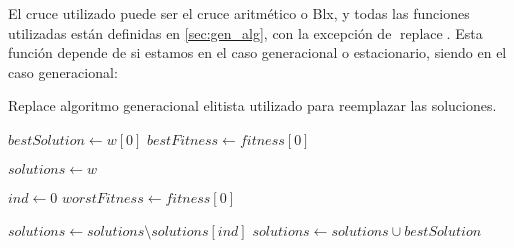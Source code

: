 \documentclass[11pt,a4paper]{article}
\begin{document}
El cruce utilizado puede ser el cruce aritmético o Blx, y todas las funciones utilizadas están definidas en \ref{sec:gen_alg}, con la excepción de $\operatorname{replace}$. Esta función depende de si estamos en el caso generacional o estacionario, siendo en el caso generacional: \\
\begin{algorithm}[H]
	\caption{{\sc Replace} algoritmo generacional elitista utilizado para reemplazar las soluciones.}
	
	$bestSolution \gets w[0]$ \;
	$bestFitness \gets fitness[0]$ \;
	
	$solutions \gets w$ \;
	
	$ind \gets 0$ \;
	$worstFitness \gets fitness[0]$ \;
	
	$solutions \gets solutions \setminus solutions[ind]$ \;
	$solutions \gets solutions \cup bestSolution$ \;
	
	 \;
\end{algorithm}
\end{document}
